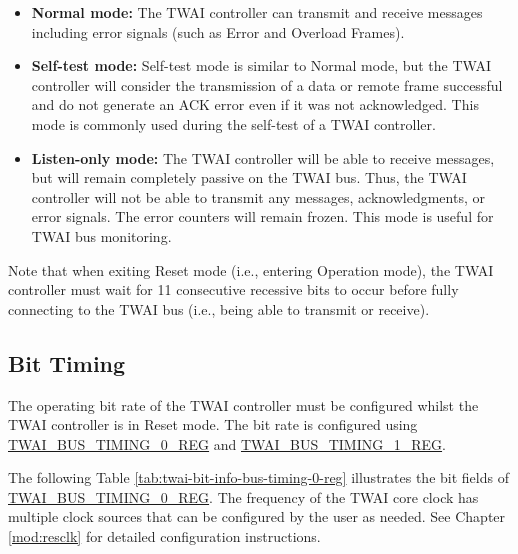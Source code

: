 \documentclass[main\_\_EN.tex]{subfiles}
\begin{document}
\begin{itemize}
    \item {\bfseries Normal mode:} The TWAI controller can transmit and receive messages including error signals (such as Error and Overload Frames).
    \item {\bfseries Self-test mode:} Self-test mode is similar to Normal mode, but the TWAI controller will consider the transmission of a data or remote frame successful and do not generate an ACK error even if it was not acknowledged. This mode is commonly used during the self-test of a TWAI controller.
    \item {\bfseries Listen-only mode:} The TWAI controller will be able to receive messages, but will remain completely passive on the TWAI bus. Thus, the TWAI controller will not be able to transmit any messages, acknowledgments, or error signals. The error counters will remain frozen. This mode is useful for TWAI bus monitoring.
\end{itemize}

Note that when exiting Reset mode (i.e., entering Operation mode), the TWAI controller must wait for 11 consecutive recessive bits to occur before fully connecting to the TWAI bus (i.e., being able to transmit or receive).

\subsection{Bit Timing}
The operating bit rate of the TWAI controller must be configured whilst the TWAI controller is in Reset mode. The bit rate is configured using \hyperref[regdesc:TWAIBUSTIMING0REG]{TWAI\_BUS\_TIMING\_0\_REG} and \hyperref[regdesc:TWAIBUSTIMING1REG]{TWAI\_BUS\_TIMING\_1\_REG}.

The following Table \ref{tab:twai-bit-info-bus-timing-0-reg} illustrates the bit fields of \hyperref[regdesc:TWAIBUSTIMING0REG]{TWAI\_BUS\_TIMING\_0\_REG}. The frequency of the TWAI core clock has multiple clock sources that can be configured by the user as needed. See Chapter \ref{mod:resclk} \textit{} for detailed configuration instructions.
\end{document}
